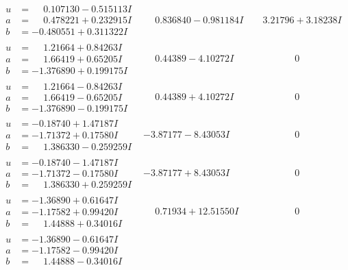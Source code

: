 \documentclass[1p]{elsarticle_modified}
\theoremstyle{definition}
\begin{document}
$$\begin{array}{c|c|c}
\begin{aligned}
u &= \phantom{-}0.107130 - 0.515113 I \\
a &= \phantom{-}0.478221 + 0.232915 I \\
b &= -0.480551 + 0.311322 I\end{aligned}
 & \phantom{-}0.836840 - 0.981184 I & \phantom{-}3.21796 + 3.18238 I \\ \hline\begin{aligned}
u &= \phantom{-}1.21664 + 0.84263 I \\
a &= \phantom{-}1.66419 + 0.65205 I \\
b &= -1.376890 + 0.199175 I\end{aligned}
 & \phantom{-}0.44389 - 4.10272 I & \phantom{-0.000000 } 0 \\ \hline\begin{aligned}
u &= \phantom{-}1.21664 - 0.84263 I \\
a &= \phantom{-}1.66419 - 0.65205 I \\
b &= -1.376890 - 0.199175 I\end{aligned}
 & \phantom{-}0.44389 + 4.10272 I & \phantom{-0.000000 } 0 \\ \hline\begin{aligned}
u &= -0.18740 + 1.47187 I \\
a &= -1.71372 + 0.17580 I \\
b &= \phantom{-}1.386330 - 0.259259 I\end{aligned}
 & -3.87177 - 8.43053 I & \phantom{-0.000000 } 0 \\ \hline\begin{aligned}
u &= -0.18740 - 1.47187 I \\
a &= -1.71372 - 0.17580 I \\
b &= \phantom{-}1.386330 + 0.259259 I\end{aligned}
 & -3.87177 + 8.43053 I & \phantom{-0.000000 } 0 \\ \hline\begin{aligned}
u &= -1.36890 + 0.61647 I \\
a &= -1.17582 + 0.99420 I \\
b &= \phantom{-}1.44888 + 0.34016 I\end{aligned}
 & \phantom{-}0.71934 + 12.51550 I & \phantom{-0.000000 } 0 \\ \hline\begin{aligned}
u &= -1.36890 - 0.61647 I \\
a &= -1.17582 - 0.99420 I \\
b &= \phantom{-}1.44888 - 0.34016 I\end{aligned}

\end{array}$$
\end{document}
